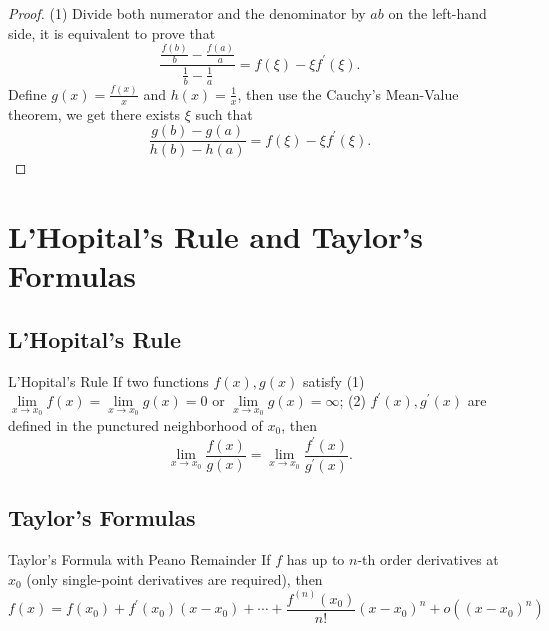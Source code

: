 \begin{proof}
  (1) Divide both numerator and the denominator by $ab$ on the left-hand side,
  it is equivalent to prove that
  \begin{equation}
    \frac{\frac{f(b)}{b} - \frac{f(a)}{a}}{\frac{1}{b} - \frac{1}{a}}
    = f(\xi) - \xi f^{\prime}(\xi).
  \end{equation}
  Define $g(x) = \frac{f(x)}{x}$ and $h(x) = \frac{1}{x}$, then use the Cauchy's
  Mean-Value theorem, we get there exists $\xi$ such that
  \begin{equation}
    \frac{g(b) - g(a)}{h(b) - h(a)} = f(\xi) - \xi f^{\prime}(\xi).
  \end{equation}
\end{proof}

\section{L'Hopital's Rule and Taylor's Formulas}

\subsection{L'Hopital's Rule}

\begin{theorem}{L'Hopital's Rule}{}
  If two functions $f(x), g(x)$ satisfy
  (1)$\lim \limits _{x \rightarrow x_0} f(x) = \lim \limits _{x \rightarrow x_0}
  g(x) = 0$ or
  $\lim \limits _{x \rightarrow x_0} g(x) = \infty$;
  (2) $f^{\prime}(x), g^{\prime}(x)$ are defined in the punctured neighborhood
  of $x_0$, then
  \begin{equation}
    \lim \limits _{x \rightarrow x_0} \frac{f(x)}{g(x)}
    = \lim \limits _{x \rightarrow x_0} \frac{f^{\prime}(x)}{g^{\prime}(x)}.
  \end{equation}
\end{theorem}


\subsection{Taylor's Formulas}

\begin{theorem}{Taylor's Formula with Peano Remainder}{}
  If $f$ has up to $n$-th order derivatives at $x_0$ (only single-point
  derivatives are required), then
  \begin{equation}
    f(x)=f(x_0)+f^{\prime}(x_0)(x-x_0)+\cdots+\frac{f^{(n)}(x_0)}{n!}(x-x_0)^n+o((x-x_0)^n)
  \end{equation}
\end{theorem}

